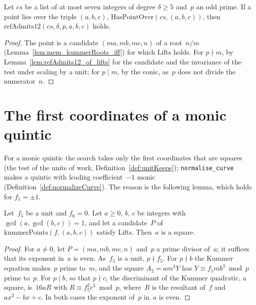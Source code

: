 \begin{lemma}\label{lem:refAdmits12_of_hasPointOver}
  \leanok
  Let $\mathit{cs}$ be a list of at most seven integers of degree $\delta \ge 5$ and~$p$ an odd
  prime. If a point lies over the triple $(a, b, c)$,
  $\mathrm{HasPointOver}(\mathit{cs}, (a, b, c))$, then
  $\mathrm{refAdmits12}(\mathit{cs}, \delta, p, a, b, c)$ holds.
\end{lemma}

\begin{proof}
  \leanok
  The point is a candidate $(m a, m b, m c, n)$ of a root~$n / m$
  (Lemma~\ref{lem:mem_kummerRoots_iff}) for which $\mathrm{Lifts}$ holds. For $p \nmid m$, by
  Lemma~\ref{lem:refAdmits12_of_lifts} for the candidate and the invariance of the test under
  scaling by a unit; for $p \mid m$, by the conic, as~$p$ does not divide the numerator~$n$.
\end{proof}

\section{The first coordinates of a monic quintic}\label{sec:sieveQuintic}

For a monic quintic the search takes only the first coordinates that are squares (the test of the
units of work, Definition~\ref{def:unitKeeps}); \texttt{normalise\_curve} makes a quintic with
leading coefficient~$-1$ monic (Definition~\ref{def:normalizeCurve}). The reason is the following
lemma, which holds for $f_5 = \pm 1$.

\begin{lemma}\label{lem:isSquare_of_mem_kummerPoints}
  \leanok
  Let~$f_5$ be a unit and $f_6 = 0$. Let $a \ge 0$, $b$, $c$ be integers with
  $\gcd(a, \gcd(b, c)) = 1$, and let a candidate~$P$ of $\mathrm{kummerPoints}(f, (a, b, c))$
  satisfy $\mathrm{Lifts}$. Then~$a$ is a square.
\end{lemma}

\begin{proof}
  \leanok
  For $a \ne 0$, let $P = (m a, m b, m c, n)$ and~$p$ a prime divisor of~$a$; it suffices that its
  exponent in~$a$ is even. As~$f_5$ is a unit, $p \nmid f_5$. For $p \nmid b$ the Kummer equation
  makes~$p$ prime to~$m$, and the square $A_2 = a m^3 Y$ has $Y \equiv f_5 m b^3 \bmod p$ prime
  to~$p$. For $p \mid b$, so that $p \nmid c$, the discriminant of the Kummer quadratic, a square,
  is~$16 a R$ with $R \equiv f_5^2 c^5 \bmod p$, where~$R$ is the resultant of~$f$ and
  $a x^2 - b x + c$. In both cases the exponent of~$p$ in~$a$ is even.
\end{proof}

